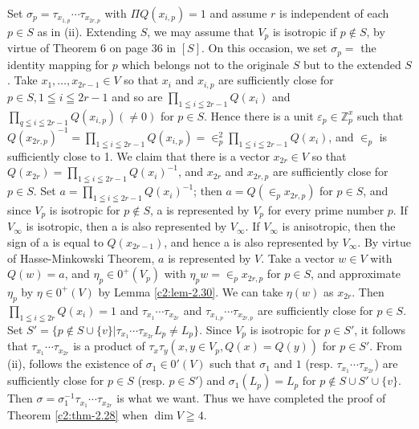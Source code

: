 \begin{enumerate}
Set $\sigma_p = \tau_{x_{1,p}} \cdots \tau_{x_{2r,p}}$ with $\Pi Q
(x_{i,p})=1$ and assume $r$ is independent of each $p\in S$ as
in (ii). Extending $S$, we may assume that $V_p$ is isotropic if
$p\not\in S$, by virtue of Theorem 6 on page 36 in $[S]$. On this
occasion, we set $\sigma_p=$ the identity mapping for $p$ which
belongs not to the originale $S$ but to the extended $S$. Take
$x_1,\ldots, x_{2r-1}\in V$ so that $x_i$ and $x_{i,p}$ are
sufficiently close for $p\in S, 1 \leqq i \leqq 2r-1$ and so
are $\prod\limits_{1\leqq i \leqq 2r-1} Q(x_i)$ and
$\prod\limits_{q\leqq i \leqq 2r-1} Q(x_{i,p}) (\neq 0)$ for
$p\in S$. Hence there is a unit
$\varepsilon_p \in \mathbb{Z}^x_p$ such that
$Q(x_{2r,p})^{-1} = \prod\limits_{1\leqq i \leqq 2r-1}Q(x_{i,p})
= \in^2_p \prod\limits_{1\leqq i \leqq 2r-1}Q(x_i)$, and
$\in_p$ is sufficiently close to 1. We claim that there is a
vector $x_{2r}\in V$ so that $Q(x_{2r})=\prod\limits_{1\leqq i
\leqq 2r-1} Q(x_i)^{-1}$, and $x_{2r}$ and $x_{2r,p}$ are sufficiently
close for $p\in S$. Set $a=\prod\limits_{1\leqq i \leqq 2r-1}
Q(x_i)^{-1}$; then $a=Q(\in_p x_{2r,p})$ for $p\in S$,
and since $V_p$ is isotropic for $p\not\in S$, a is represented by
$V_p$ for every prime \pageoriginale number $p$. If $V_{\infty}$ is
isotropic, then a is also represented by $V_{\infty}$. If $V_{\infty}$
is anisotropic, then the sign of a is equal to $Q(x_{2r-1})$, and
hence a is also represented by $V_{\infty}$. By virtue of
Hasse-Minkowski Theorem, $a$ is represented by $V$. Take a vector
$w\in V$ with $Q(w)=a$, and $\eta_p \in 0^+(V_p)$ with
$\eta_p w = \in_p x_{2r,p}$ for $p \in S$, and
approximate $\eta_p$ by $\eta \in 0^+(V)$ by Lemma \ref{c2:lem-2.30}. We
can take $\eta(w)$ as $x_{2r}$. Then $\prod\limits_{1\leqq i \leqq 2r}
Q(x_i)=1$ and $\tau_{x_1} \cdots \tau_{x_{2r}}$ and
$\tau_{x_{1,p}} \cdots \tau_{x_{2r,p}}$ are sufficiently close for
$p\in S$. Set $S'=\{p\not\in
S \cup \{v\}|\tau_{x_1} \cdots \tau_{x_{2r}} L_p \neq L_p\}$. Since
$V_p$ is isotropic for $p\in S'$, it follows that
$\tau_{x_1} \cdots \tau_{x_{2r}}$ is a product of
$\tau_x \tau_y(x,y \in V_p, Q(x) =Q(y))$ for $p\in
S'$. From (ii), follows the existence of $\sigma_1 \in 0'(V)$
such that $\sigma_1$ and $1$ (resp. $\tau_{x_1} \cdots \tau_{x_{2r}}$)
are sufficiently close for $p\in S$ (resp. $p\in S'$)
and $\sigma_1 (L_p)=L_p$ for $p\not\in S \cup S' \cup \{v\}$. Then
$\sigma = \sigma^{-1}_1 \tau_{x_1} \cdots \tau_{x_{2r}}$ is what we
want. Thus we have completed the proof of Theorem \ref{c2:thm-2.28} when $\dim
V \geqq 4$.
\end{enumerate}

